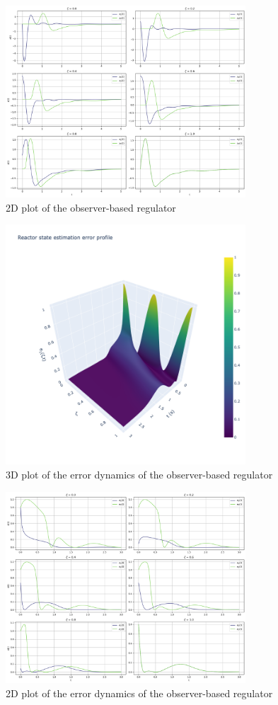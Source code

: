 \begin{figure}[H]
    \centering
    \includegraphics[width=0.8\textwidth]{Figures/2D_xt_L_k7.png}
    \caption{2D plot of the observer-based regulator}
    \label{fig:2D_xt_L_k7}
\end{figure}

\begin{figure}[H]
    \centering
    \includegraphics[width=0.8\textwidth]{Figures/3D_e1_L_k7.png}
    \caption{3D plot of the error dynamics of the observer-based regulator}
    \label{fig:3D_e1_L_k7}
\end{figure}

\begin{figure}[H]
    \centering
    \includegraphics[width=0.8\textwidth]{Figures/2D_et_L_k7.png}
    \caption{2D plot of the error dynamics of the observer-based regulator}
    \label{fig:2D_et_L_k7}
\end{figure}